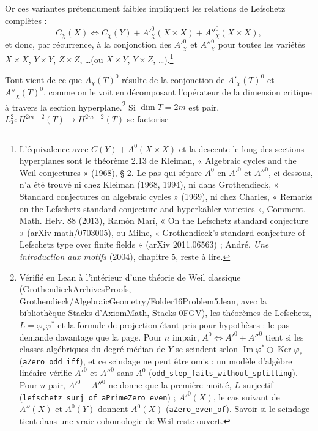 \documentclass[11pt,a4paper]{article}
\begin{document}
Or ces variantes prétendument faibles impliquent les relations de Lefschetz
complètes :
\[
C_{\chi}(X) \iff
C_{\chi}(Y) + A'^{0}_{\chi}(X \times X) + A''^{0}_{\chi}(X \times X),
\]
et donc, par récurrence, à la conjonction des $A'^{0}_{\chi}$ et
$A''^{0}_{\chi}$ pour toutes les variétés $X \times X$, $Y \times Y$,
$Z \times Z$, \ldots (ou $X \times Y$, $Y \times Z$, \ldots).\footnote{L'équivalence
avec $C(Y) + A^{0}(X \times X)$ et la descente le long des sections
hyperplanes sont le théorème 2.13 de Kleiman, « Algebraic cycles and the Weil
conjectures » (1968), § 2. Le pas qui sépare $A^{0}$ en $A'^{0}$ et
$A''^{0}$, ci-dessous, n'a été trouvé ni chez Kleiman (1968, 1994), ni dans
Grothendieck, « Standard conjectures on algebraic cycles » (1969), ni chez
Charles, « Remarks on the Lefschetz standard conjecture and hyperkähler
varieties », Comment. Math. Helv. 88 (2013), Ramón Marí, « On the Lefschetz
standard conjecture » (arXiv math/0703005), ou Milne, « Grothendieck's
standard conjecture of Lefschetz type over finite fields » (arXiv
2011.06563) ; André, \emph{Une
introduction aux motifs} (2004), chapitre 5, reste à lire.}

Tout vient de ce que $A_{\chi}(T)^{0}$ résulte de la conjonction de
$A'_{\chi}(T)^{0}$ et $A''_{\chi}(T)^{0}$, comme on le voit en décomposant
l'opérateur de la dimension critique à travers la section hyperplane.\footnote{Vérifié en Lean à l'intérieur d'une théorie de Weil classique
(GrothendieckArchivesProofs, Grothendieck/AlgebraicGeometry/Folder16Problem5.lean, avec la bibliothèque Stacks d'AxiomMath,
Stacks 0FGV), les théorèmes de Lefschetz, $L = \varphi_*\varphi^*$ et la formule de
projection étant pris pour hypothèses : le pas demande davantage que la page.
Pour $n$ impair, $A^{0} \Leftrightarrow A'^{0} + A''^{0}$ tient si les classes
algébriques du degré médian de $Y$ se scindent selon $\operatorname{Im}\varphi^*
\oplus \operatorname{Ker}\varphi_*$ (\texttt{aZero\_odd\_iff}), et ce
scindage ne peut être omis : un modèle d'algèbre linéaire vérifie $A'^{0}$ et
$A''^{0}$ sans $A^{0}$ (\texttt{odd\_step\_fails\_without\_splitting}). Pour
$n$ pair, $A'^{0} + A''^{0}$ ne donne que la première moitié, $L$ surjectif
(\texttt{lefschetz\_surj\_of\_aPrimeZero\_even}) ; $A'^{0}(X)$, le cas
suivant de $A''(X)$ et $A^{0}(Y)$ donnent $A^{0}(X)$ (\texttt{aZero\_even\_of}).
Savoir si le scindage tient dans une vraie cohomologie de Weil reste ouvert.} Si
$\dim T = 2m$ est pair, $L_{T}^{2} \colon H^{2m-2}(T) \to H^{2m+2}(T)$ se
factorise

\end{document}
